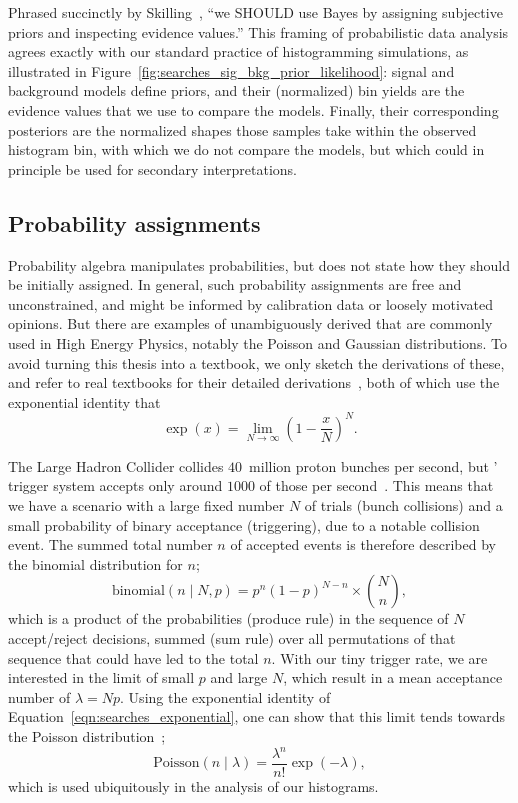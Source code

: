 Phrased succinctly by Skilling~\cite{skilling2008rant},
``we SHOULD use Bayes by assigning subjective priors and inspecting evidence
values.''
This framing of probabilistic data analysis agrees exactly with our standard
practice of histogramming simulations,
as illustrated in Figure~\ref{fig:searches_sig_bkg_prior_likelihood}:
signal and background models define priors, and their (normalized) bin yields
are the evidence values that we use to compare the models.
Finally, their corresponding posteriors are the normalized shapes those samples
take within the observed histogram bin, with which we do not compare the
models, but which could in principle be used for secondary interpretations.

\subsection{Probability assignments}
Probability algebra manipulates probabilities, but does not state how they
should be initially assigned.
In general, such probability assignments are free and unconstrained, and might
be informed by calibration data or loosely motivated opinions.
But there are examples of unambiguously derived that are commonly used in
High Energy Physics, notably the Poisson and Gaussian distributions.
To avoid turning this thesis into a textbook, we only sketch the derivations
of these, and refer to real textbooks for their detailed
derivations~\cite{jaynes2003probability}, both of which use the exponential
identity that
\begin{equation}
\label{eqn:searches_exponential}
\exp(x) = \displaystyle \lim_{N \to \infty}
\left(1 - \frac{x}{N}\right)^N
.
\end{equation}

The Large Hadron Collider collides $40$~million proton bunches per second,
but \atlas' trigger system accepts only around $1000$ of
those per second~\cite{atlas2020trigger}.
This means that we have a scenario with a large fixed number $N$ of trials
(bunch collisions)
and a small probability of binary acceptance (triggering),
due to a notable collision event.
The summed total number $n$ of accepted events is therefore described by the
binomial distribution for $n$;
\begin{equation}
\label{eqn:searches_binomial}
\mathrm{binomial}(n\mid N, p) = p^n (1 - p)^{N - n} \times \binom{N}{n}
,
\end{equation}
which is a product of the probabilities (produce rule) in the sequence of $N$
accept/reject decisions, summed (sum rule) over all permutations of that sequence
that could have led to the total $n$.
With our tiny trigger rate, we are interested in the limit of small
$p$ and large $N$, which result in a mean acceptance number of $\lambda = Np$.
Using the exponential identity of Equation~\ref{eqn:searches_exponential}, one
can show that this limit tends towards the Poisson
distribution~\cite{jaynes2003probability};
\begin{equation}
\label{eqn:searches_poisson}
\mathrm{Poisson}(n\mid \lambda) = \frac{\lambda^n}{n!}\exp(-\lambda)
,
\end{equation}
which is used ubiquitously in the analysis of our histograms.


